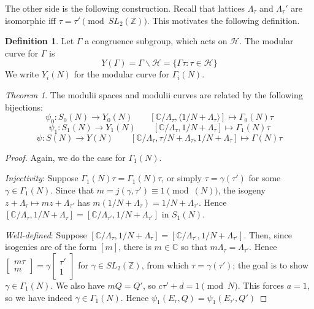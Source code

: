 \documentclass[11pt]{article}
\theoremstyle{definition}
\newtheorem{definition}{Definition}[section]
\theoremstyle{example}
\theoremstyle{remark}
\theoremstyle{lemma}
\theoremstyle{proposition}
\theoremstyle{Problem}
\theoremstyle{Solution}
\theoremstyle{theorem}
\newtheorem{theorem}{Theorem}[section]
\theoremstyle{corollary}
\begin{document}
The other side is the following construction. Recall that lattices $\Lambda_\tau$ and $\Lambda_\tau'$ are isomorphic iff $\tau = \tau' \pmod{SL_2(\mathbb{Z})}$. This motivates the following definition.
\begin{definition}
Let $\Gamma$ a congruence subgroup, which acts on $\mathcal{H}$. The modular curve for $\Gamma$ is 
$$Y(\Gamma)  = \Gamma\backslash\mathcal{H} = \{\Gamma\tau : \tau\in\mathcal{H}\}$$
We write $Y_i(N)$ for the modular curve for $\Gamma_i(N)$.
\end{definition}

\begin{theorem}
The modulii spaces and modulii curves are related by the following bijections:
$$\psi_0: S_0(N) \to Y_0(N) \qquad [\mathbb{C}/\Lambda_\tau, \langle 1/N + \Lambda_\tau\rangle] \mapsto \Gamma_0(N)\tau$$
$$\psi_1: S_1(N) \to Y_1(N) \qquad [\mathbb{C}/\Lambda_\tau, 1/N + \Lambda_\tau] \mapsto \Gamma_1(N)\tau$$
$$\psi: S(N) \to Y(N) \qquad [\mathbb{C}/\Lambda_\tau, \tau/N + \Lambda_\tau, 1/N+\Lambda_\tau] \mapsto \Gamma(N)\tau$$
\end{theorem}
\begin{proof}
Again, we do the case for $\Gamma_1(N)$.

\textit{Injectivity}: Suppose $\Gamma_1(N)\tau = \Gamma_1(N)\tau$, or simply $\tau = \gamma(\tau')$ for some $\gamma\in\Gamma_1(N)$. Since that $m=j(\gamma, \tau') \equiv 1 \pmod{(N)}$, the isogeny $z+\Lambda_\tau \mapsto mz+\Lambda_{\tau'}$ has $m(1/N+\Lambda_\tau) = 1/N + \Lambda_{\tau'}$. Hence $[\mathbb{C}/\Lambda_\tau, 1/N+\Lambda_\tau] = [\mathbb{C}/\Lambda_{\tau'}, 1/N+\Lambda_{\tau'}]$ in $S_1(N)$.

\textit{Well-defined}: Suppose $[\mathbb{C}/\Lambda_\tau, 1/N+\Lambda_\tau] = [\mathbb{C}/\Lambda_{\tau'}, 1/N+\Lambda_{\tau'}]$. Then, since isogenies are of the form $[m]$, there is $m\in \mathbb{C}$ so that $m\Lambda_{\tau} = \Lambda_{\tau'}$. Hence $\begin{bmatrix}m\tau \\ m\end{bmatrix} =\gamma\begin{bmatrix} \tau'\\ 1\end{bmatrix}$ for $\gamma\in SL_2(\mathbb{Z})$, from which $\tau=\gamma(\tau')$; the goal is to show $\gamma\in\Gamma_1(N)$. We also have $mQ=Q'$, so $c\tau'+d = 1 \pmod{N}$. This forces $a=1$, so we have indeed $\gamma\in\Gamma_1(N)$. Hence $\psi_1(E_\tau, Q)=\psi_1(E_{\tau'}, Q')$
\end{proof}
\end{document}
